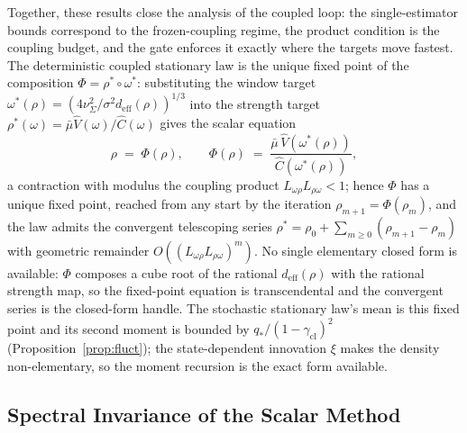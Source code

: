 Together, these results close the analysis of the coupled loop: the single-estimator bounds correspond to the frozen-coupling regime, the product condition is the coupling budget, and the gate enforces it exactly where the targets move fastest.
The deterministic coupled stationary law is the unique fixed point of the composition $\Phi = \rho^*\circ\omega^*$: substituting the window target $\omega^*(\rho) = (4\nu^2_\Sigma/\sigma^2 d_{\mathrm{eff}}(\rho))^{1/3}$ into the strength target $\rho^*(\omega) = \bar\mu\widehat V(\omega)/\widehat C(\omega)$ gives the scalar equation
\[
\rho \;=\; \Phi(\rho), \qquad
\Phi(\rho) \;=\; \frac{\bar\mu\,\widehat V(\omega^*(\rho))}{\widehat C(\omega^*(\rho))},
\]
a contraction with modulus the coupling product $L_{\omega\rho}L_{\rho\omega} < 1$; hence $\Phi$ has a unique fixed point, reached from any start by the iteration $\rho_{m+1} = \Phi(\rho_m)$, and the law admits the convergent telescoping series $\rho^* = \rho_0 + \sum_{m\ge0}(\rho_{m+1}-\rho_m)$ with geometric remainder $O((L_{\omega\rho}L_{\rho\omega})^m)$.
No single elementary closed form is available: $\Phi$ composes a cube root of the rational $d_{\mathrm{eff}}(\rho)$ with the rational strength map, so the fixed-point equation is transcendental and the convergent series is the closed-form handle.
The stochastic stationary law's mean is this fixed point and its second moment is bounded by $q_*/(1-\gamma_{\mathrm{cl}})^2$ (Proposition~\ref{prop:fluct}); the state-dependent innovation $\xi$ makes the density non-elementary, so the moment recursion is the exact form available.

\subsection{Spectral Invariance of the Scalar Method}
\label{app:invariance}

